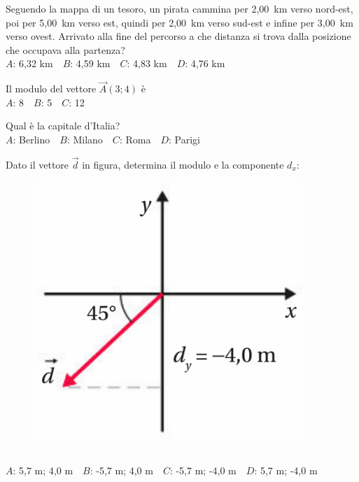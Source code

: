 \mcquestionheader Seguendo la mappa di un tesoro, un pirata cammina per 2,00~km verso nord-est, poi per 5,00~km verso est, quindi per 2,00~km verso sud-est e infine per 3,00~km verso ovest. Arrivato alla fine del percorso a che distanza si trova dalla posizione che occupava alla partenza?\\
{$A$}: 6,32 km\ \ {$B$}: 4,59 km\ \ {$C$}: 4,83 km\ \ {$D$}: 4,76 km\ \ 

\mcquestionfooter



\def\mcquestionnumber{9}


\mcquestionheader Il modulo del vettore $\vec{A}(3;4)$ è\\
{$A$}: 8\ \ {$B$}: 5\ \ {$C$}: 12\ \ 

\mcquestionfooter



\def\mcquestionnumber{10}


\mcquestionheader Qual è la capitale d’Italia?\\
{$A$}: Berlino\ \ {$B$}: Milano\ \ {$C$}: Roma\ \ {$D$}: Parigi\ \ 

\mcquestionfooter



\def\mcquestionnumber{11}


\mcquestionheader Dato il vettore $\vec{d}$ in figura, determina il modulo e la componente $d_x$: \begin{figure}[h!]   \begin{center}     \includegraphics[scale=0.35]{vettored.png}   \end{center} \end{figure}\\
{$A$}: 5,7 m; 4,0 m\ \ {$B$}: -5,7 m; 4,0 m\ \ {$C$}: -5,7 m; -4,0 m\ \ {$D$}: 5,7 m; -4,0 m\ \ 

